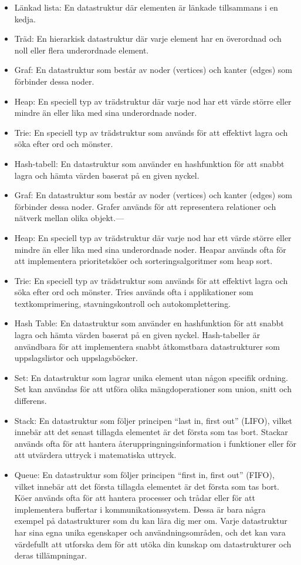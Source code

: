 \begin{itemize}
\tightlist
\item
  Länkad lista: En datastruktur där elementen är länkade tillsammans i
  en kedja.
\item
  Träd: En hierarkisk datastruktur där varje element har en överordnad
  och noll eller flera underordnade element.
\item
  Graf: En datastruktur som består av noder (vertices) och kanter
  (edges) som förbinder dessa noder.
\item
  Heap: En speciell typ av trädstruktur där varje nod har ett värde
  större eller mindre än eller lika med sina underordnade noder.
\item
  Trie: En speciell typ av trädstruktur som används för att effektivt
  lagra och söka efter ord och mönster.
\item
  Hash-tabell: En datastruktur som använder en hashfunktion för att
  snabbt lagra och hämta värden baserat på en given nyckel.
\item
  Graf: En datastruktur som består av noder (vertices) och kanter
  (edges) som förbinder dessa noder. Grafer används för att representera
  relationer och nätverk mellan olika objekt.---
\item
  Heap: En speciell typ av trädstruktur där varje nod har ett värde
  större eller mindre än eller lika med sina underordnade noder. Heapar
  används ofta för att implementera prioritetsköer och
  sorteringsalgoritmer som heap sort.
\item
  Trie: En speciell typ av trädstruktur som används för att effektivt
  lagra och söka efter ord och mönster. Tries används ofta i
  applikationer som textkomprimering, stavningskontroll och
  autokomplettering.
\item
  Hash Table: En datastruktur som använder en hashfunktion för att
  snabbt lagra och hämta värden baserat på en given nyckel.
  Hash-tabeller är användbara för att implementera snabbt åtkomstbara
  datastrukturer som uppslagslistor och uppslagsböcker.
\item
  Set: En datastruktur som lagrar unika element utan någon specifik
  ordning. Set kan användas för att utföra olika mängdoperationer som
  union, snitt och differens.
\item
  Stack: En datastruktur som följer principen ``last in, first out''
  (LIFO), vilket innebär att det senast tillagda elementet är det första
  som tas bort. Stackar används ofta för att hantera
  återuppringningsinformation i funktioner eller för att utvärdera
  uttryck i matematiska uttryck.
\item
  Queue: En datastruktur som följer principen ``first in, first out''
  (FIFO), vilket innebär att det första tillagda elementet är det första
  som tas bort. Köer används ofta för att hantera processer och trådar
  eller för att implementera buffertar i kommunikationssystem. Dessa är
  bara några exempel på datastrukturer som du kan lära dig mer om. Varje
  datastruktur har sina egna unika egenskaper och användningsområden,
  och det kan vara värdefullt att utforska dem för att utöka din kunskap
  om datastrukturer och deras tillämpningar.
\end{itemize}


